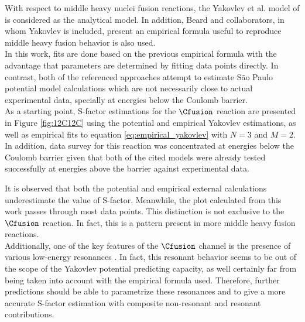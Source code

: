 \documentclass[openany]{book}
\begin{document}
With respect to middle heavy nuclei fusion reactions, the Yakovlev et al. model of \cite{yakovlev_beard_gasques_wiescher_2010} is considered as the analytical model. In addition, Beard and collaborators, in whom Yakovlev is included, present an empirical formula useful to reproduce middle heavy fusion behavior \cite{beard_afanasjev_chamon_gasques_wiescher_yakovlev_2010} is also used. \\

In this work, fits are done based on the previous empirical formula  with the advantage that parameters are determined by fitting data points directly. In contrast, both of the referenced approaches attempt to estimate São Paulo potential model calculations which are not necessarily close to actual experimental data, specially at energies below the Coulomb barrier. \\

As a starting point, S-factor estimations for the $\Cfusion$ reaction are presented in Figure \ref{fig:12C12C} using the potential and empirical Yakovlev estimations, as well as empirical fits to equation \ref{eq:empirical_yakovlev} with $N = 3$ and $M = 2$. In addition, data survey for this reaction was concentrated at energies below the Coulomb barrier given that both of the cited models were already tested successfully at energies above the barrier against experimental data.


It is observed that both the potential and empirical external calculations underestimate the value of S-factor. Meanwhile, the plot calculated from this work passes through most data points. This distinction is not exclusive to the $\Cfusion$ reaction. In fact, this is a pattern present in more middle heavy fusion reactions. \\

Additionally, one of the key features of the $\Cfusion$ channel is the presence of various low-energy resonances \cite{notani_esbensen_fang_bucher_davies_jiang_lamm_lin_ma_martin_et_2012}. In fact, this resonant behavior seems to be out of the scope of the Yakovlev potential predicting capacity, as well certainly far from being taken into account with the empirical formula used.  Therefore, further predictions should be able to parametrize these resonances and to give a more accurate S-factor estimation with composite non-resonant and resonant contributions. \\
\end{document}
